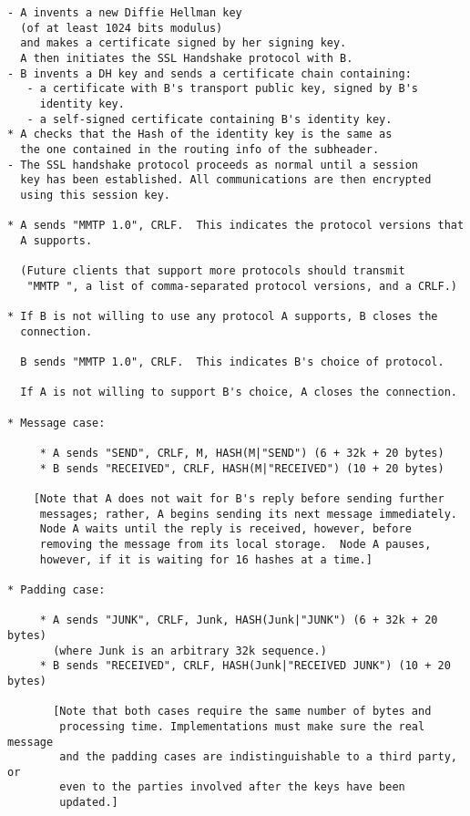 \begin{verbatim}
- A invents a new Diffie Hellman key 
  (of at least 1024 bits modulus)
  and makes a certificate signed by her signing key.
  A then initiates the SSL Handshake protocol with B.
- B invents a DH key and sends a certificate chain containing:
   - a certificate with B's transport public key, signed by B's
     identity key. 
   - a self-signed certificate containing B's identity key.
* A checks that the Hash of the identity key is the same as
  the one contained in the routing info of the subheader.
- The SSL handshake protocol proceeds as normal until a session
  key has been established. All communications are then encrypted
  using this session key.

* A sends "MMTP 1.0", CRLF.  This indicates the protocol versions that
  A supports.

  (Future clients that support more protocols should transmit
   "MMTP ", a list of comma-separated protocol versions, and a CRLF.)

* If B is not willing to use any protocol A supports, B closes the 
  connection.

  B sends "MMTP 1.0", CRLF.  This indicates B's choice of protocol.

  If A is not willing to support B's choice, A closes the connection.

* Message case:

     * A sends "SEND", CRLF, M, HASH(M|"SEND") (6 + 32k + 20 bytes)
     * B sends "RECEIVED", CRLF, HASH(M|"RECEIVED") (10 + 20 bytes)

    [Note that A does not wait for B's reply before sending further
     messages; rather, A begins sending its next message immediately.
     Node A waits until the reply is received, however, before
     removing the message from its local storage.  Node A pauses,
     however, if it is waiting for 16 hashes at a time.]

* Padding case:

     * A sends "JUNK", CRLF, Junk, HASH(Junk|"JUNK") (6 + 32k + 20 bytes)
       (where Junk is an arbitrary 32k sequence.)
     * B sends "RECEIVED", CRLF, HASH(Junk|"RECEIVED JUNK") (10 + 20 bytes)

       [Note that both cases require the same number of bytes and 
        processing time. Implementations must make sure the real message 
        and the padding cases are indistinguishable to a third party, or
        even to the parties involved after the keys have been
        updated.]


\end{verbatim}
